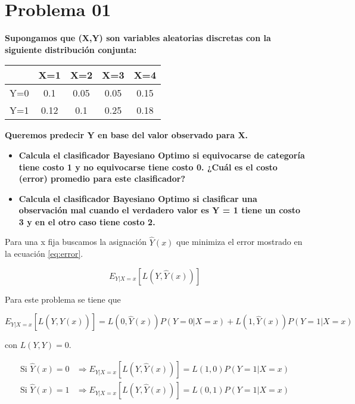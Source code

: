 \section*{Problema 01}

\textbf{Supongamos que (X,Y) son variables aleatorias discretas con la siguiente distribución conjunta:}

\begin{table}[H]
    \centering
    \begin{tabular}{ccccc} \hline
            & X=1  & X=2  & X=3  & X=4  \\  \hline
        Y=0 & 0.1  & 0.05 & 0.05 & 0.15 \\
        Y=1 & 0.12 & 0.1  & 0.25 & 0.18 \\ \hline
    \end{tabular}
\end{table}

\textbf{Queremos predecir Y en base del valor observado para X.}

\begin{itemize}
    \item \textbf{Calcula el clasificador Bayesiano Optimo si equivocarse de categoría tiene costo 1 y no equivocarse tiene costo 0. ¿Cuál es el costo (error) promedio para este clasificador?}
    \item \textbf{Calcula el clasificador Bayesiano Optimo si clasificar una observación mal cuando el verdadero valor es Y = 1 tiene un costo 3 y en el otro caso tiene costo 2.}
\end{itemize}

Para una x fija buscamos la asignación $\hat{Y}(x)$ que minimiza el error mostrado en la ecuación \ref{eq:error}.

\begin{equation}
    E_{Y|X=x} [L(Y,\hat{Y}(x))] \label{eq:error}
\end{equation}

Para este problema se tiene que

\begin{equation*}
    E_{Y|X=x} [L(Y,\hat{Y}(x))] = L(0,\hat{Y}(x)) P(Y=0|X=x) + L(1,\hat{Y}(x)) P(Y=1|X=x)
\end{equation*}

con $L(Y,Y)=0$.

\begin{align*}
    \text{Si } \hat{Y}(x)=0 & \Rightarrow E_{Y|X=x} [L(Y,\hat{Y}(x))]  = L(1,0)P(Y=1|X=x) \\[0.25cm]
    \text{Si } \hat{Y}(x)=1 & \Rightarrow E_{Y|X=x} [L(Y,\hat{Y}(x))]  = L(0,1)P(Y=1|X=x)
\end{align*}

